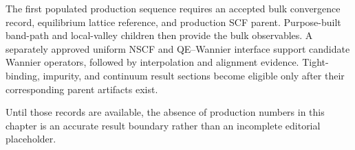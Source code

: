 The first populated production sequence requires an accepted bulk convergence
record, equilibrium lattice reference, and production SCF parent. Purpose-built
band-path and local-valley children then provide the bulk observables. A
separately approved uniform NSCF and QE--Wannier interface support candidate
Wannier operators, followed by interpolation and alignment evidence. Tight-
binding, impurity, and continuum result sections become eligible only after
their corresponding parent artifacts exist.

Until those records are available, the absence of production numbers in this
chapter is an accurate result boundary rather than an incomplete editorial
placeholder.
